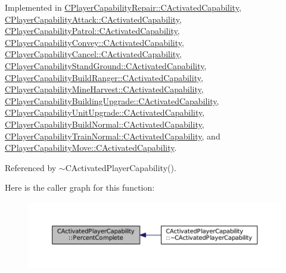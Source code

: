 Implemented in \hyperlink{classCPlayerCapabilityRepair_1_1CActivatedCapability_a88276fec60e08b56daecfd14b36fe888}{C\+Player\+Capability\+Repair\+::\+C\+Activated\+Capability}, \hyperlink{classCPlayerCapabilityAttack_1_1CActivatedCapability_a75866109b62de0522622b03137461519}{C\+Player\+Capability\+Attack\+::\+C\+Activated\+Capability}, \hyperlink{classCPlayerCapabilityPatrol_1_1CActivatedCapability_a868e6583a55b01e5aa3b926ef14677bc}{C\+Player\+Capability\+Patrol\+::\+C\+Activated\+Capability}, \hyperlink{classCPlayerCapabilityConvey_1_1CActivatedCapability_aec6b75fc004f4ac18755d8f601c8ffca}{C\+Player\+Capability\+Convey\+::\+C\+Activated\+Capability}, \hyperlink{classCPlayerCapabilityCancel_1_1CActivatedCapability_a69d2fec27186cba11ab545560e7bf45d}{C\+Player\+Capability\+Cancel\+::\+C\+Activated\+Capability}, \hyperlink{classCPlayerCapabilityStandGround_1_1CActivatedCapability_aa9bf1824e755460b699d81f866f2aadc}{C\+Player\+Capability\+Stand\+Ground\+::\+C\+Activated\+Capability}, \hyperlink{classCPlayerCapabilityBuildRanger_1_1CActivatedCapability_a2e1c0859b129404fe1cc65bcdb187bad}{C\+Player\+Capability\+Build\+Ranger\+::\+C\+Activated\+Capability}, \hyperlink{classCPlayerCapabilityMineHarvest_1_1CActivatedCapability_ac198166a008306dc543ceed94baaf4a3}{C\+Player\+Capability\+Mine\+Harvest\+::\+C\+Activated\+Capability}, \hyperlink{classCPlayerCapabilityBuildingUpgrade_1_1CActivatedCapability_afb2aab171773fa9f33539e33315c1c28}{C\+Player\+Capability\+Building\+Upgrade\+::\+C\+Activated\+Capability}, \hyperlink{classCPlayerCapabilityUnitUpgrade_1_1CActivatedCapability_a16026f30b1ec10fbd4cb7049d0b74719}{C\+Player\+Capability\+Unit\+Upgrade\+::\+C\+Activated\+Capability}, \hyperlink{classCPlayerCapabilityBuildNormal_1_1CActivatedCapability_a40bf27f9dfe88ad17a51ebb12c078568}{C\+Player\+Capability\+Build\+Normal\+::\+C\+Activated\+Capability}, \hyperlink{classCPlayerCapabilityTrainNormal_1_1CActivatedCapability_ac0d2dd8e1b3aedb0873149ba4c92e6f7}{C\+Player\+Capability\+Train\+Normal\+::\+C\+Activated\+Capability}, and \hyperlink{classCPlayerCapabilityMove_1_1CActivatedCapability_a1696dd16d89d0978284a95dd1531d0d5}{C\+Player\+Capability\+Move\+::\+C\+Activated\+Capability}.



Referenced by $\sim$\+C\+Activated\+Player\+Capability().

Here is the caller graph for this function\+:\nopagebreak
\begin{figure}[H]
\begin{center}
\leavevmode
\includegraphics[width=350pt]{classCActivatedPlayerCapability_a405dc6076058006a4f801727de4cfe4d_icgraph}
\end{center}
\end{figure}


